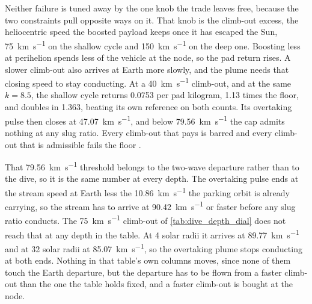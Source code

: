\documentclass{article}
\begin{document}
Neither failure is tuned away by the one knob the trade leaves free, because the two constraints pull opposite ways on it. That knob is the climb-out excess, the heliocentric speed the boosted payload keeps once it has escaped the Sun, \SI{75}{\kilo\meter\per\second} on the shallow cycle and \SI{150}{\kilo\meter\per\second} on the deep one. Boosting less at perihelion spends less of the vehicle at the node, so the pad return rises. A slower climb-out also arrives at Earth more slowly, and the plume needs that closing speed to stay conducting. At a \SI{40}{\kilo\meter\per\second} climb-out, and at the same $k = 8.5$, the shallow cycle returns \num{0.0753} per pad kilogram, \num{1.13} times the floor, and doubles in \SI{1.363}{\year}, beating its own reference on both counts. Its overtaking pulse then closes at \SI{47.07}{\kilo\meter\per\second}, and below \SI{79.56}{\kilo\meter\per\second} the cap admits nothing at any slug ratio. Every climb-out that pays is barred and every climb-out that is admissible fails the floor \cite{Katz_aim_is_all_you_need_2025}.

That \SI{79.56}{\kilo\meter\per\second} threshold belongs to the two-wave departure rather than to the dive, so it is the same number at every depth. The overtaking pulse ends at the stream speed at Earth less the \SI{10.86}{\kilo\meter\per\second} the parking orbit is already carrying, so the stream has to arrive at \SI{90.42}{\kilo\meter\per\second} or faster before any slug ratio conducts. The \SI{75}{\kilo\meter\per\second} climb-out of \autoref{tab:dive_depth_dial} does not reach that at any depth in the table. At 4 solar radii it arrives at \SI{89.77}{\kilo\meter\per\second} and at 32 solar radii at \SI{85.07}{\kilo\meter\per\second}, so the overtaking plume stops conducting at both ends. Nothing in that table's own columns moves, since none of them touch the Earth departure, but the departure has to be flown from a faster climb-out than the one the table holds fixed, and a faster climb-out is bought at the node.
\end{document}
